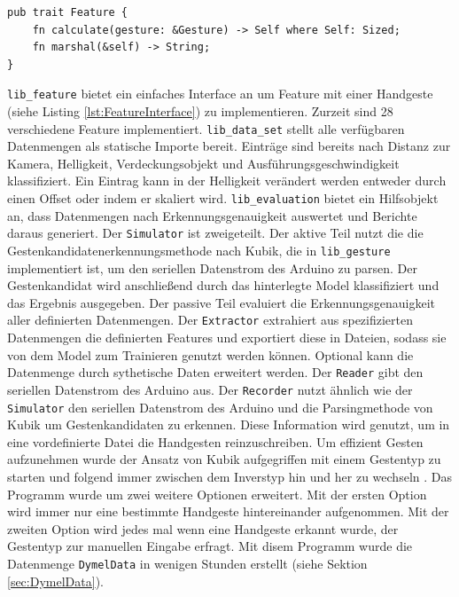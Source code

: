 \begin{lstlisting}[label=lst:FeatureInterface,caption={Interface, um ein Feature zu implementieren.}]
pub trait Feature {
    fn calculate(gesture: &Gesture) -> Self where Self: Sized;
    fn marshal(&self) -> String;
}
\end{lstlisting}
\texttt{lib\_feature} bietet ein einfaches Interface an um Feature mit einer Handgeste (siehe Listing \ref{lst:FeatureInterface}) zu implementieren. Zurzeit sind 28 verschiedene Feature implementiert.
\newline
\newline
\texttt{lib\_data\_set} stellt alle verfügbaren Datenmengen als statische Importe bereit. Einträge sind bereits nach Distanz zur Kamera, Helligkeit, Verdeckungsobjekt und Ausführungsgeschwindigkeit klassifiziert. Ein
Eintrag kann in der Helligkeit verändert werden entweder durch einen Offset oder indem er skaliert wird.
\newline
\newline
\texttt{lib\_evaluation} bietet ein Hilfsobjekt an, dass Datenmengen nach Erkennungsgenauigkeit auswertet und Berichte daraus generiert.
\newline
\newline
Der \texttt{Simulator} ist zweigeteilt. Der aktive Teil nutzt die die Gestenkandidatenerkennungsmethode nach Kubik, die in \texttt{lib\_gesture} implementiert ist, um den seriellen Datenstrom des Arduino zu parsen. Der
Gestenkandidat wird anschließend durch das hinterlegte Model klassifiziert und das Ergebnis ausgegeben. Der passive Teil evaluiert die Erkennungsgenauigkeit aller definierten Datenmengen.
\newline
\newline
Der \texttt{Extractor} extrahiert aus spezifizierten Datenmengen die definierten Features und exportiert diese in Dateien, sodass sie von dem Model zum Trainieren genutzt werden können. Optional kann die Datenmenge durch
sythetische Daten erweitert werden.
\newline
\newline
Der \texttt{Reader} gibt den seriellen Datenstrom des Arduino aus.
\newline
\newline
Der \texttt{Recorder} nutzt ähnlich wie der \texttt{Simulator} den seriellen Datenstrom des Arduino und die Parsingmethode von Kubik um Gestenkandidaten zu erkennen.
Diese Information wird genutzt, um in eine vordefinierte Datei die Handgesten reinzuschreiben. Um effizient Gesten aufzunehmen wurde der Ansatz von Kubik aufgegriffen mit
einem Gestentyp zu starten und folgend immer zwischen dem Inverstyp hin und her zu wechseln \cite{venzkeArticle}.
\newline
\newline
Das Programm wurde um zwei weitere Optionen erweitert. Mit der ersten Option wird immer nur eine bestimmte Handgeste hintereinander aufgenommen. Mit der zweiten Option wird jedes mal wenn eine Handgeste erkannt wurde,
der Gestentyp zur manuellen Eingabe erfragt. Mit disem Programm wurde die Datenmenge \texttt{DymelData} in wenigen Stunden erstellt (siehe Sektion \ref{sec:DymelData}).